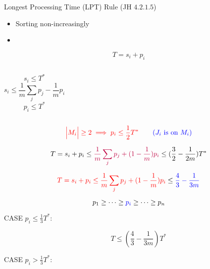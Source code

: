 \begin{frame}
  \begin{exampleblock}{Longest Processing Time (LPT) Rule (JH $4.2.1.5$)}
	\begin{itemize}
	  \item Sorting non-increasingly
	  \item {}
	\end{itemize}
  \end{exampleblock}

  \pause
  \[
	T = s_i + p_i 
  \]

  \begin{columns}
	  \[
		s_i \le T^{\ast}
	  \]
	  \[
		s_i \le \frac{1}{m} \sum_{j} p_j - \frac{1}{m} p_{i}
	  \]
	  \[
		p_i \le T^{\ast}
	  \]
  \end{columns}

  \pause
  \vspace{0.50cm}
  \[
	\textcolor{red}{\Big|M_i\Big| \ge 2 \implies p_i \le \frac{1}{2} T^{\ast}} \qquad \textcolor{blue}{(J_i \text{ is on } M_i)}
  \]

  \pause
  \[
	T = s_i + p_i \le \textcolor{purple}{\frac{1}{m} \sum_{j} p_j + (1 - \frac{1}{m}) p_{i}} \le (\frac{3}{2} - \frac{1}{2m}) T^{\ast}
  \]
\end{frame}

\begin{frame}
  \[
	\textcolor{red}{T = s_i + p_i \le \frac{1}{m} \sum_{j} p_j + (1 - \frac{1}{m}) p_{i}} \le \textcolor{blue}{\frac{4}{3} - \frac{1}{3m}}
  \]

  \pause
  \[
	p_1 \ge \cdots \ge \textcolor{blue}{p_i} \ge \cdots \ge p_n
  \]

  \begin{description}
	\item[CASE $p_i \le \frac{1}{3} T^{\ast}$:] 
	  \[
		T \le (\frac{4}{3} - \frac{1}{3m}) T^{\ast}
	  \]
	\item[CASE $p_i > \frac{1}{3} T^{\ast}$:]
  \end{description}
\end{frame}

